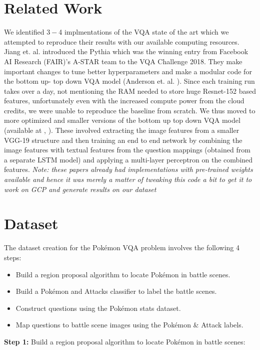 \documentclass[journal, a4paper]{IEEEtran}
\begin{document}
\section{Related Work}
	We identified $3-$4 implmentations of the VQA state of the art which we attempted to reproduce their results with our available computing resources. Jiang et. al. \cite{PYTHIA} introduced the Pythia which was the winning entry from Facebook AI Research (FAIR)'s A-STAR team to the VQA Challenge 2018. They make important changes to tune better hyperparameters and make a modular code for the bottom up- top down VQA model (Anderson et. al. \cite{BOTTOMUP}). Since each training run takes over a day, not mentioning the RAM needed to store huge Resnet-152 based features, unfortunately even with the increased compute power from the cloud credits, we were unable to reproduce the baseline from scratch. We thus moved to more optimized and smaller versions of the bottom up top down VQA model (available at \cite{VQA1}, \cite{VQA2}). These involved extracting the image features from a smaller VGG-19 structure and then training an end to end network by combining the image features with textual features from the question mappings (obtained from a separate LSTM model) and applying a multi-layer perceptron on the combined features. 
	\newline
	\textit{Note: these papers already had implementations with pre-trained weights available and hence it was merely a matter of tweaking this code a bit to get it to work on GCP and generate results on our dataset}

\section{Dataset}
The dataset creation for the Pok\'emon VQA problem involves the following 4 steps: \\

\begin{itemize}
    \item Build a region proposal algorithm to locate Pok\'emon in battle scenes.
    \item Build a Pok\'emon and Attacks classifier to label the battle scenes.
    \item Construct questions using the Pok\'emon stats dataset.
    \item Map questions to battle scene images using the Pok\'emon \& Attack labels.
\end{itemize}

\textbf{Step 1:} Build a region proposal algorithm to locate Pok\'emon in battle scenes:
\end{document}
